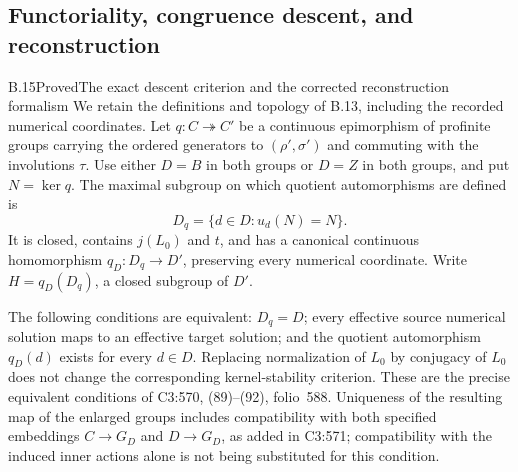 \subsection{Functoriality, congruence descent, and reconstruction}

\begin{statement}{B.15}{Proved}{The exact descent criterion and the corrected reconstruction formalism}
We retain the definitions and topology of B.13, including the
recorded numerical coordinates. Let
\(q:C\twoheadrightarrow C'\) be a continuous epimorphism of
profinite groups carrying the ordered generators to
\((\rho',\sigma')\) and commuting with the involutions \(\tau\).
Use either \(D=B\) in both groups or \(D=Z\) in both groups, and put
\(N=\ker q\). The maximal subgroup on which quotient automorphisms
are defined is
\[
 D_q=\{d\in D:u_d(N)=N\}.
 \tag{B.15.1}
\]
It is closed, contains \(j(L_0)\) and \(t\), and has a canonical
continuous homomorphism
\(q_D:D_q\to D'\), preserving every numerical coordinate. Write
\(H=q_D(D_q)\), a closed subgroup of \(D'\).

The following conditions are equivalent: \(D_q=D\); every effective
source numerical solution maps to an effective target solution;
and the quotient automorphism \(q_D(d)\) exists for every \(d\in D\).
Replacing normalization of \(L_0\) by conjugacy of \(L_0\) does not
change the corresponding kernel-stability criterion. These are the
precise equivalent conditions of C3:570, (89)--(92), folio~588.
Uniqueness of the resulting map of the enlarged groups includes
compatibility with both specified embeddings \(C\to G_D\) and
\(D\to G_D\), as added in C3:571; compatibility with the induced
inner actions alone is not being substituted for this condition.


\end{statement}

